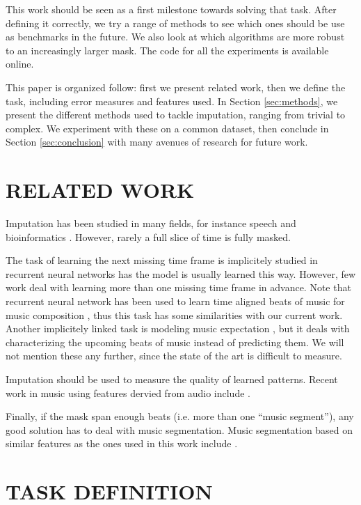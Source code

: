\documentclass{article}
\begin{document}
This work should be seen as a first milestone towards solving that task.
After defining it correctly, we try a range of methods to see which ones should
be use as benchmarks in the future. We also look at which algorithms are more robust
to an increasingly larger mask. The code for all the experiments is available
online.

This paper is organized follow: first we present related work, then we define the
task, including error measures and features used. In Section \ref{sec:methods},
we present the different methods used to tackle imputation, ranging from trivial
to complex. We experiment with these on a common dataset, then conclude in
Section \ref{sec:conclusion} with many avenues of research for future work.


\section{RELATED WORK}
\label{sec:relatedwork}
Imputation has been studied in many fields, for instance speech 
\cite{Morris1998,Smaragdis2009} and bioinformatics \cite{Oba2003}.
However, rarely a full slice of time is fully masked.

The task of learning the next missing time frame is implicitely studied in recurrent
neural networks has the model is usually learned this way. However, few work deal
with learning more than one missing time frame in advance. Note that recurrent neural
network has been used to learn time aligned beats of music for music composition
\cite{Todd1989,Mozer1994a,Eck2002d}, thus this task has some similarities with our current
work. Another implicitely linked task is modeling music expectation \cite{Hazan2010}, but it deals
with characterizing the upcoming beats of music instead of predicting them.
We will not mention these any further, since the state of the art is difficult to measure.

Imputation should be used to measure the quality of learned patterns. Recent work in music
using features dervied from audio include 
\cite{Anglade2009,Bertin-Mahieux2010a,Casey2007,Weiss2010}.

Finally, if the mask span enough beats (i.e. more than one ``music segment''), any good
solution has to deal with music segmentation. Music segmentation based on similar features as
the ones used in this work include \cite{Weiss2010,Levy2008,Mauch2009}.




\section{TASK DEFINITION}
\label{sec:task}
\end{document}
